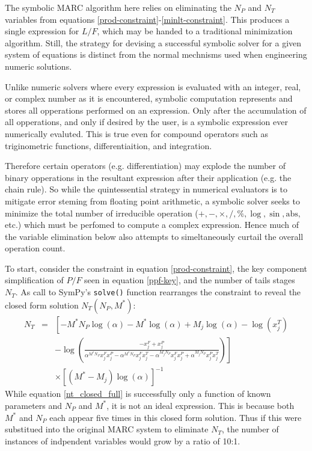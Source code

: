 \documentclass[preprint,12pt]{elsarticle}
\begin{document}
The symbolic MARC algorithm here relies on eliminating the $N_P$ and $N_T$ variables
from equations \ref{prod-constraint}-\ref{minlt-constraint}. This produces a single
expression for $L/F$, which may be handed to a traditional minimization algorithm.
Still, the strategy for devising a successful symbolic solver for a given system
of equations is distinct from the normal mechnisms used when engineering numeric 
solutions.

Unlike numeric solvers where every expression is evaluated with an integer, real, or
complex number as it is encountered, symbolic computation represents and stores all 
opperations performed on an expression.  Only after the accumulation of all 
opperations, and only if desired by the user, is a symbolic expression ever numerically
evaluted.  This is true even for compound operators such as triginometric functions, 
differentiaition, and integration.

Therefore certain operators (e.g. differentiation) may explode the number of binary
opperations in the resultant expression after their application (e.g. the chain rule).
So while the quintessential strategy in numerical evaluators is to mitigate error
steming from floating point arithmetic, a symbolic solver seeks to minimize the total
number of irreducible operation ($+, -, \times, /, \%, \log, \sin, \mbox{abs},$ etc.) 
which must be perfomed to compute a complex expression.  Hence much of the variable
elimination below also attempts to simeltaneously curtail the overall operation count. 

To start, consider the constraint in equation \ref{prod-constraint}, the key 
component simplification of $P/F$ seen in equation \ref{ppf-key}, and the number
of tails stages $N_T$.  As call to SymPy's \texttt{solve()} function rearranges the 
constraint to reveal the closed form solution $N_T(N_P, M^*)$:
\begin{equation}
\begin{array}{lcl}
N_T & = & \left[- M^{*} N_{P} \log{\left (\alpha \right )} - M^{*} \log{\left (\alpha \right )} + M_{j} \log{\left (\alpha \right )} - \log{\left (x^{T}_{j} \right )} \right. \\ 
& & \left. - \log{\left (\frac{- x^{F}_{j} + x^{P}_{j}}{\alpha^{M^{*} N_{P}} x^{F}_{j} x^{P}_{j} - \alpha^{M^{*} N_{P}}x^{F}_{j} x^{T}_{j} - \alpha^{M_{j} N_{P}} x^{F}_{j} x^{P}_{j} + \alpha^{M_{j} N_{P}} x^{P}_{j} x^{T}_{j}} \right )} \right] \\
& & \times \left[\left(M^{*} - M_{j}\right) \log{\left (\alpha \right )} \right]^{-1}
\end{array}
\label{nt_closed_full}
\end{equation}
While equation \ref{nt_closed_full} is successfully only a function of known 
parameters and $N_P$ and $M^*$, it is not an ideal expression.  This is because both 
$M^*$ and $N_P$ each appear five times in this closed form solution.  Thus if this 
were substitued into the original MARC system to eliminate $N_T$, the number of 
instances of indpendent variables would grow by a ratio of 10:1.    
\end{document}
